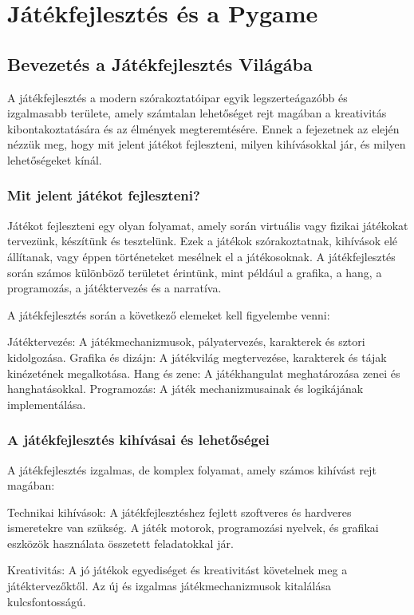 \chapter{Játékfejlesztés és a Pygame}

\section{Bevezetés a Játékfejlesztés Világába}

A játékfejlesztés a modern szórakoztatóipar egyik legszerteágazóbb és izgalmasabb területe, amely számtalan lehetőséget rejt magában a kreativitás kibontakoztatására és az élmények megteremtésére. Ennek a fejezetnek az elején nézzük meg, hogy mit jelent játékot fejleszteni, milyen kihívásokkal jár, és milyen lehetőségeket kínál.

\subsection{Mit jelent játékot fejleszteni?}
Játékot fejleszteni egy olyan folyamat, amely során virtuális vagy fizikai játékokat tervezünk, készítünk és tesztelünk. Ezek a játékok szórakoztatnak, kihívások elé állítanak, vagy éppen történeteket mesélnek el a játékosoknak. A játékfejlesztés során számos különböző területet érintünk, mint például a grafika, a hang, a programozás, a játéktervezés és a narratíva.

A játékfejlesztés során a következő elemeket kell figyelembe venni:

Játéktervezés: A játékmechanizmusok, pályatervezés, karakterek és sztori kidolgozása.
Grafika és dizájn: A játékvilág megtervezése, karakterek és tájak kinézetének megalkotása.
Hang és zene: A játékhangulat meghatározása zenei és hanghatásokkal.
Programozás: A játék mechanizmusainak és logikájának implementálása.
\subsection{A játékfejlesztés kihívásai és lehetőségei}
A játékfejlesztés izgalmas, de komplex folyamat, amely számos kihívást rejt magában:

Technikai kihívások: A játékfejlesztéshez fejlett szoftveres és hardveres ismeretekre van szükség. A játék motorok, programozási nyelvek, és grafikai eszközök használata összetett feladatokkal jár.

Kreativitás: A jó játékok egyediséget és kreativitást követelnek meg a játéktervezőktől. Az új és izgalmas játékmechanizmusok kitalálása kulcsfontosságú.

